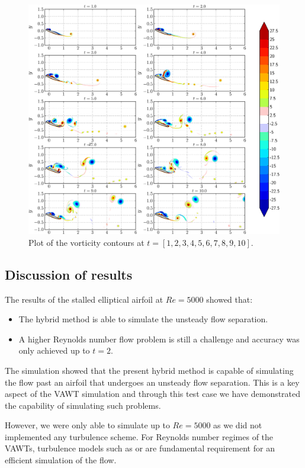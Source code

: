 	\begin{figure}[!t]
	\centering
	\includegraphics[width=\linewidth]{./figures/validation/ellipse/hybrid_ellipse_Hybrid_contours_compressed-crop.png}
	\caption{Plot of the vorticity contours at $t=[1,2,3,4,5,6,7,8,9,10]$.}
	\label{fig:hybrid_ellipse_Hybrid_contours}
	\end{figure}
	
\subsection{Discussion of results}	

The results of the stalled elliptical airfoil at $Re=5000$ showed that:
\begin{itemize}
\item The hybrid method is able to simulate the unsteady flow separation.
\item A higher Reynolds number flow problem is still a challenge and accuracy was only achieved up to $t=2$.
\end{itemize}

The simulation showed that the present hybrid method is capable of simulating the flow past an airfoil that undergoes an unsteady flow separation. This is a key aspect of the VAWT simulation and through this test case we have demonstrated the capability of simulating such problems.

However, we were only able to simulate up to $Re=5000$ as we did not implemented any turbulence scheme. For Reynolds number regimes of the VAWTs, turbulence models such as  or  are fundamental requirement for an efficient simulation of the flow.

